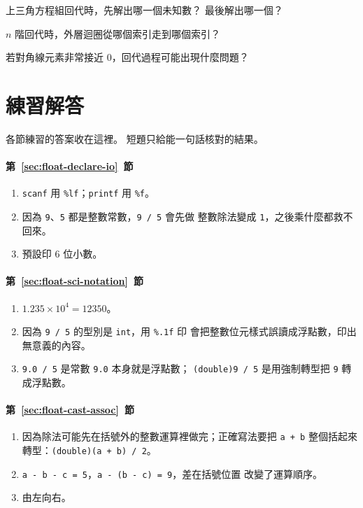 \begin{drills}[label=drills:float-back-sub]
\item 上三角方程組回代時，先解出哪一個未知數？ 最後解出哪一個？
\item $n$ 階回代時，外層迴圈從哪個索引走到哪個索引？
\item 若對角線元素非常接近 $0$，回代過程可能出現什麼問題？
\end{drills}

\section*{練習解答}

各節練習的答案收在這裡。 短題只給能一句話核對的結果。

\paragraph{第~\ref{sec:float-declare-io}~節}
\begin{enumerate}
\item \texttt{scanf} 用 \texttt{\%lf}；\texttt{printf} 用 \texttt{\%f}。
\item 因為 \texttt{9}、\texttt{5} 都是整數常數，\texttt{9 / 5} 會先做
整數除法變成 \texttt{1}，之後乘什麼都救不回來。
\item 預設印 $6$ 位小數。
\end{enumerate}

\paragraph{第~\ref{sec:float-sci-notation}~節}
\begin{enumerate}
\item $1.235 \times 10^4 = 12350$。
\item 因為 \texttt{9 / 5} 的型別是 \texttt{int}，用 \texttt{\%.1f} 印
會把整數位元樣式誤讀成浮點數，印出無意義的內容。
\item \texttt{9.0 / 5} 是常數 \texttt{9.0} 本身就是浮點數；
\texttt{(double)9 / 5} 是用強制轉型把 \texttt{9} 轉成浮點數。
\end{enumerate}

\paragraph{第~\ref{sec:float-cast-assoc}~節}
\begin{enumerate}
\item 因為除法可能先在括號外的整數運算裡做完；正確寫法要把
\texttt{a + b} 整個括起來轉型：\texttt{(double)(a + b) / 2}。
\item \texttt{a - b - c = 5}，\texttt{a - (b - c) = 9}，差在括號位置
改變了運算順序。
\item 由左向右。
\end{enumerate}

